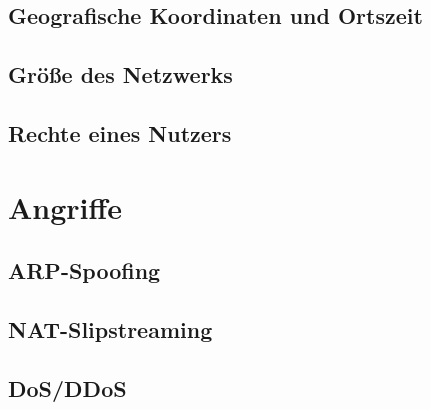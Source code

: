 \subsection{Geografische Koordinaten und Ortszeit}
\subsection{Größe des Netzwerks}
\subsection{Rechte eines Nutzers}
\section{Angriffe}
\subsection{ARP-Spoofing}
\subsection{NAT-Slipstreaming}
\subsection{DoS/DDoS}
\subsection{}
